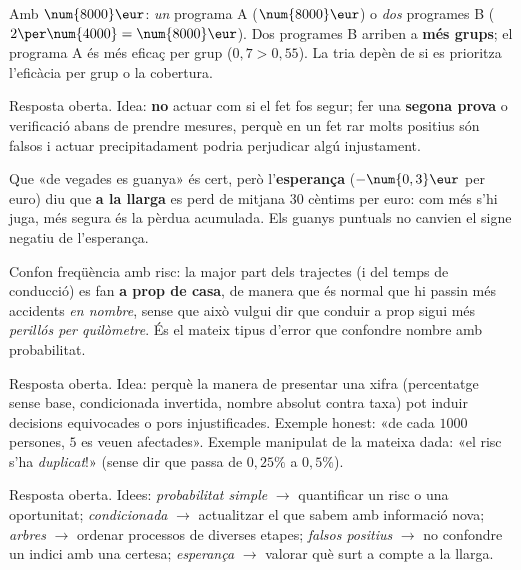 \begin{solucions}
\begin{sollist}
  \item Amb $\num{8000}\eur$: \emph{un} programa A ($\num{8000}\eur$) o \emph{dos}
        programes B ($2\per\num{4000}=\num{8000}\eur$). Dos programes B arriben a
        \textbf{més grups}; el programa A és més eficaç per grup ($0,7>0,55$). La tria
        depèn de si es prioritza l'eficàcia per grup o la cobertura.
  \item Resposta oberta. Idea: \textbf{no} actuar com si el fet fos segur; fer una
        \textbf{segona prova} o verificació abans de prendre mesures, perquè en un fet
        rar molts positius són falsos i actuar precipitadament podria perjudicar algú
        injustament.
  \item Que «de vegades es guanya» és cert, però l'\textbf{esperança} ($-\num{0,3}\eur$
        per euro) diu que \textbf{a la llarga} es perd de mitjana $30$ cèntims per euro:
        com més s'hi juga, més segura és la pèrdua acumulada. Els guanys puntuals no
        canvien el signe negatiu de l'esperança.
  \item Confon freqüència amb risc: la major part dels trajectes (i del temps de
        conducció) es fan \textbf{a prop de casa}, de manera que és normal que hi passin
        més accidents \emph{en nombre}, sense que això vulgui dir que conduir a prop sigui
        més \emph{perillós per quilòmetre}. És el mateix tipus d'error que confondre
        nombre amb probabilitat.
  \item Resposta oberta. Idea: perquè la manera de presentar una xifra (percentatge sense
        base, condicionada invertida, nombre absolut contra taxa) pot induir decisions
        equivocades o pors injustificades. Exemple honest: «de cada $\num{1000}$ persones,
        $5$ es veuen afectades». Exemple manipulat de la mateixa dada: «el risc s'ha
        \emph{duplicat}!» (sense dir que passa de $0,25\%$ a $0,5\%$).
  \item Resposta oberta. Idees: \emph{probabilitat simple} $\rightarrow$ quantificar un
        risc o una oportunitat; \emph{condicionada} $\rightarrow$ actualitzar el que sabem
        amb informació nova; \emph{arbres} $\rightarrow$ ordenar processos de diverses
        etapes; \emph{falsos positius} $\rightarrow$ no confondre un indici amb una
        certesa; \emph{esperança} $\rightarrow$ valorar què surt a compte a la llarga.
\end{sollist}
\end{solucions}
